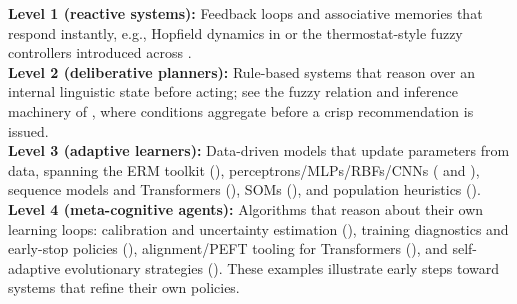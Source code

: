 \begin{tcolorbox}[summarybox, title={Four-level taxonomy in practice}]
\textbf{Level 1 (reactive systems):} Feedback loops and associative memories that respond instantly, e.g., Hopfield dynamics in  or the thermostat-style fuzzy controllers introduced across .\\
\textbf{Level 2 (deliberative planners):} Rule-based systems that reason over an internal linguistic state before acting; see the fuzzy relation and inference machinery of , where conditions aggregate before a crisp recommendation is issued.\\
\textbf{Level 3 (adaptive learners):} Data-driven models that update parameters from data, spanning the ERM toolkit (), perceptrons/MLPs/RBFs/CNNs ( and ), sequence models and Transformers (), SOMs (), and population heuristics ().\\
\textbf{Level 4 (meta-cognitive agents):} Algorithms that reason about their own learning loops: calibration and uncertainty estimation (), training diagnostics and early-stop policies (), alignment/PEFT tooling for Transformers (), and self-adaptive evolutionary strategies (). These examples illustrate early steps toward systems that refine their own policies.
\end{tcolorbox}


